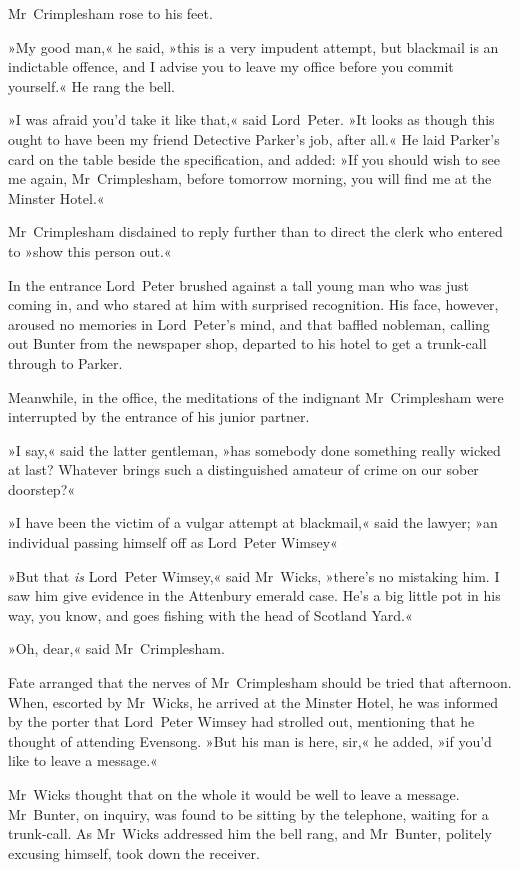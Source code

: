 Mr~Crimplesham rose to his feet.

»My good man,« he said, »this is a very impudent attempt, but blackmail is an indictable offence, and I advise you to leave my office before you commit yourself.« He rang the bell.

»I was afraid you'd take it like that,« said Lord~Peter. »It looks as though this ought to have been my friend Detective Parker's job, after all.« He laid Parker's card on the table beside the specification, and added: »If you should wish to see me again, Mr~Crimplesham, before tomorrow morning, you will find me at the Minster Hotel.«

Mr~Crimplesham disdained to reply further than to direct the clerk who entered to »show this person out.«

In the entrance Lord~Peter brushed against a tall young man who was just coming in, and who stared at him with surprised recognition. His face, however, aroused no memories in Lord~Peter's mind, and that baffled nobleman, calling out Bunter from the newspaper shop, departed to his hotel to get a trunk-call through to Parker.

Meanwhile, in the office, the meditations of the indignant Mr~Crimplesham were interrupted by the entrance of his junior partner.

»I say,« said the latter gentleman, »has somebody done something really wicked at last? Whatever brings such a distinguished amateur of crime on our sober doorstep?«

»I have been the victim of a vulgar attempt at blackmail,« said the lawyer; »an individual passing himself off as Lord~Peter Wimsey\longdash«

»But that \textit{is} Lord~Peter Wimsey,« said Mr~Wicks, »there's no mistaking him. I saw him give evidence in the Attenbury emerald case. He's a big little pot in his way, you know, and goes fishing with the head of Scotland Yard.«

»Oh, dear,« said Mr~Crimplesham.

Fate arranged that the nerves of Mr~Crimplesham should be tried that afternoon. When, escorted by Mr~Wicks, he arrived at the Minster Hotel, he was informed by the porter that Lord~Peter Wimsey had strolled out, mentioning that he thought of attending Evensong. »But his man is here, sir,« he added, »if you'd like to leave a message.«

Mr~Wicks thought that on the whole it would be well to leave a message. Mr~Bunter, on inquiry, was found to be sitting by the telephone, waiting for a trunk-call. As Mr~Wicks addressed him the bell rang, and Mr~Bunter, politely excusing himself, took down the receiver.

